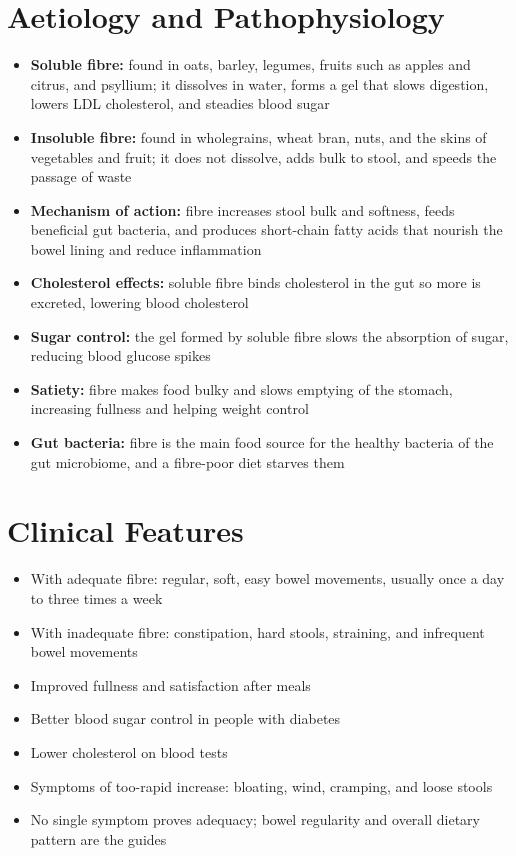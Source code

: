 \section*{Aetiology and Pathophysiology}
\begin{itemize}
    \item \textbf{Soluble fibre:} found in oats, barley, legumes, fruits such as apples and citrus, and psyllium; it dissolves in water, forms a gel that slows digestion, lowers LDL cholesterol, and steadies blood sugar
    \item \textbf{Insoluble fibre:} found in wholegrains, wheat bran, nuts, and the skins of vegetables and fruit; it does not dissolve, adds bulk to stool, and speeds the passage of waste
    \item \textbf{Mechanism of action:} fibre increases stool bulk and softness, feeds beneficial gut bacteria, and produces short-chain fatty acids that nourish the bowel lining and reduce inflammation
    \item \textbf{Cholesterol effects:} soluble fibre binds cholesterol in the gut so more is excreted, lowering blood cholesterol
    \item \textbf{Sugar control:} the gel formed by soluble fibre slows the absorption of sugar, reducing blood glucose spikes
    \item \textbf{Satiety:} fibre makes food bulky and slows emptying of the stomach, increasing fullness and helping weight control
    \item \textbf{Gut bacteria:} fibre is the main food source for the healthy bacteria of the gut microbiome, and a fibre-poor diet starves them
\end{itemize}

\section*{Clinical Features}
\begin{itemize}
    \item With adequate fibre: regular, soft, easy bowel movements, usually once a day to three times a week
    \item With inadequate fibre: constipation, hard stools, straining, and infrequent bowel movements
    \item Improved fullness and satisfaction after meals
    \item Better blood sugar control in people with diabetes
    \item Lower cholesterol on blood tests
    \item Symptoms of too-rapid increase: bloating, wind, cramping, and loose stools
    \item No single symptom proves adequacy; bowel regularity and overall dietary pattern are the guides
\end{itemize}

